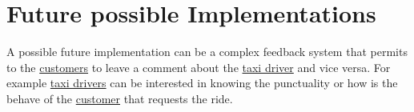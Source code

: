 \documentclass{report}
\begin{document}
	\section{Future possible Implementations}
	A possible future implementation can be a complex feedback system that permits to the \hyperref[sec:customer]{customers} to leave a comment about the \hyperref[sec:tdriver]{taxi driver} and vice versa.
	For example \hyperref[sec:tdriver]{taxi drivers} can be interested in knowing the punctuality or how is the behave of the \hyperref[sec:customer]{customer} that requests the ride.
\end{document}
